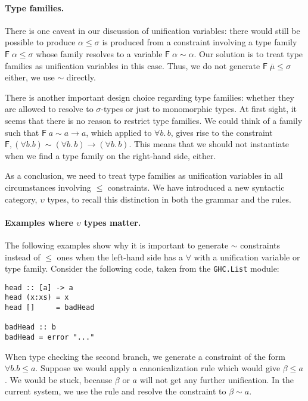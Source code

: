 \documentclass[12pt]{article}
\begin{document}
\paragraph{Type families.} There is one caveat in our discussion of unification variables: there would still be possible to produce $\alpha \leq \sigma$ is produced from a constraint involving a type family $\mathsf{F} \; \alpha \leq \sigma$ whose family resolves to a variable $\mathsf{F} \; \alpha \sim \alpha$. Our solution is to treat type families as unification variables in this case. Thus, we do not generate $\mathsf{F} \; \overline{\mu} \leq \sigma$ either, we use $\sim$ directly.

There is another important design choice regarding type families: whether they are allowed to resolve to $\sigma$-types or just to monomorphic types. At first sight, it seems that there is no reason to restrict type families. We could think of a family such that $\mathsf{F} \; a \sim a \to a$, which applied to $\forall b. \, b$, gives rise to the constraint $\mathsf{F} , (\forall b. b) \sim (\forall b. \, b) \to (\forall b. \, b)$. This means that we should not instantiate when we find a type family on the right-hand side, either.

As a conclusion, we need to treat type families as unification variables in all circumstances involving $\leq$ constraints. We have introduced a new syntactic category, $\upsilon$ types, to recall this distinction in both the grammar and the rules.

\paragraph{Examples where $\upsilon$ types matter.}
The following examples show why it is important to generate $\sim$ constraints instead of $\leq$ ones when the left-hand side has a $\forall$ with a unification variable or type family. Consider the following code, taken from the {\tt GHC.List} module:
\begin{verbatim}
head :: [a] -> a
head (x:xs) = x
head []     = badHead

badHead :: b
badHead = error "..."
\end{verbatim}
When type checking the second branch, we generate a constraint of the form $\forall b. b \leq a$. Suppose we would apply a canonicalization rule which would give $\beta \leq a$. We would be stuck, because $\beta$ or $a$ will not get any further unification. In the current system, we use the rule {} and resolve the constraint to $\beta \sim a$.
\end{document}
